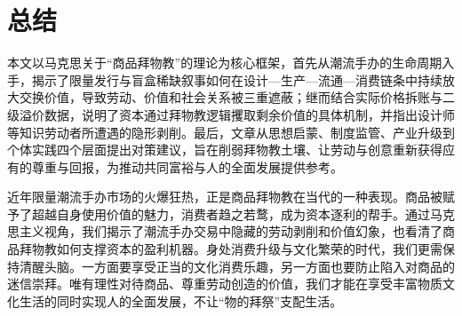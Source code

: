 
\chapter{总结}
本文以马克思关于“商品拜物教”的理论为核心框架，首先从潮流手办的生命周期入手，揭示了限量发行与盲盒稀缺叙事如何在设计—生产—流通—消费链条中持续放大交换价值，导致劳动、价值和社会关系被三重遮蔽；继而结合实际价格拆账与二级溢价数据，说明了资本通过拜物教逻辑攫取剩余价值的具体机制，并指出设计师等知识劳动者所遭遇的隐形剥削。最后，文章从思想启蒙、制度监管、产业升级到个体实践四个层面提出对策建议，旨在削弱拜物教土壤、让劳动与创意重新获得应有的尊重与回报，为推动共同富裕与人的全面发展提供参考。

近年限量潮流手办市场的火爆狂热，正是商品拜物教在当代的一种表现。商品被赋予了超越自身使用价值的魅力，消费者趋之若鹜，成为资本逐利的帮手。通过马克思主义视角，我们揭示了潮流手办交易中隐藏的劳动剥削和价值幻象，也看清了商品拜物教如何支撑资本的盈利机器。身处消费升级与文化繁荣的时代，我们更需保持清醒头脑。一方面要享受正当的文化消费乐趣，另一方面也要防止陷入对商品的迷信崇拜。唯有理性对待商品、尊重劳动创造的价值，我们才能在享受丰富物质文化生活的同时实现人的全面发展，不让“物的拜祭”支配生活。